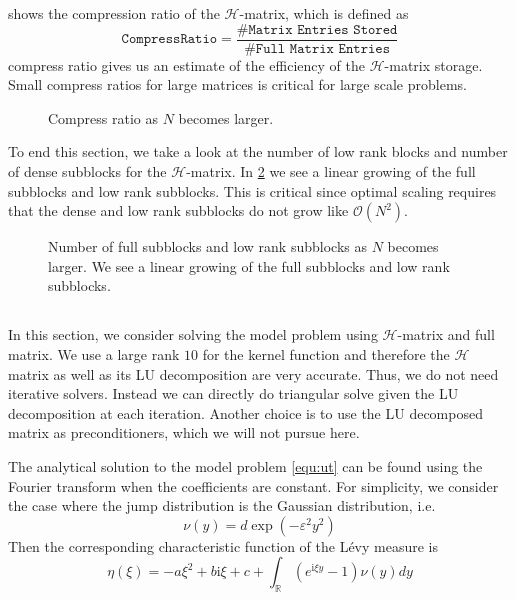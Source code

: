 \documentclass[10pt,a4paper]{article}
\newcommand{\ii}[0]{\mathrm{i}}
\newcommand{\RR}[0]{\mathbb{R}}
\theoremstyle{definition}
\begin{document}
 shows the compression ratio of the $\mathcal{H}$-matrix, which is defined as
\begin{equation}
\texttt{CompressRatio}=\frac{\#\texttt{Matrix Entries Stored}}{\#\texttt{Full Matrix Entries}}
\end{equation}
compress ratio gives us an estimate of the efficiency of the $\mathcal{H}$-matrix storage. Small compress ratios for large matrices is critical for large scale problems. 

\begin{figure}[htpb]
\centering
\scalebox{0.6}{}
\caption{Compress ratio as $N$ becomes larger.}
\label{fig:compress}
\end{figure}

To end this section, we take a look at the number of low rank blocks and number of dense subblocks for the $\mathcal{H}$-matrix. In \cref{fig:dense} we see a linear growing of the full subblocks and low rank subblocks. This is critical since optimal scaling requires that the dense and low rank subblocks do not grow like $\mathcal{O}(N^2)$. 

\begin{figure}[htpb]
\centering
\scalebox{0.6}{}
\caption{Number of full subblocks and low rank subblocks as $N$ becomes larger. We see a linear growing of the full subblocks and low rank subblocks.}
\label{fig:dense}
\end{figure}

\subsection{}

In this section, we consider solving the model problem using $\mathcal{H}$-matrix and full matrix. We use a large rank $10$ for the kernel function and therefore the $\mathcal{H}$ matrix as well as its LU decomposition are very accurate. Thus, we do not need iterative solvers. Instead we can directly do triangular solve given the LU decomposition at each iteration. Another choice is to use the LU decomposed matrix as preconditioners, which we will not pursue here.  

The analytical solution to the model problem \cref{equ:ut} can be found using the Fourier transform when the coefficients are constant. For simplicity, we consider the case where the jump distribution is the Gaussian distribution, i.e. 
\begin{equation}
	\nu(y) = d\exp(-\varepsilon^2 y^2)
\end{equation}
Then the corresponding characteristic function of the L\'evy measure is 
\begin{equation}
	\eta(\xi) = -a\xi^2 + b\ii \xi + c + \int_\RR (e^{\ii \xi y}-1)\nu(y)dy
\end{equation}
\end{document}
